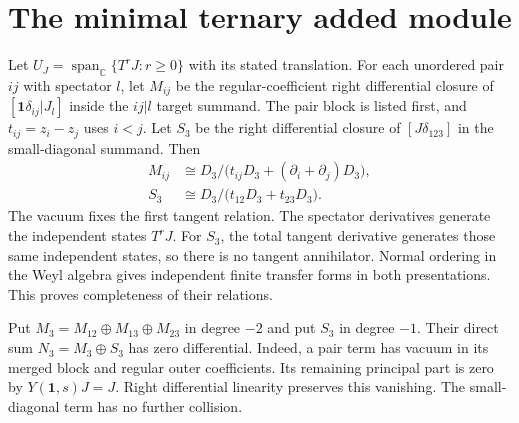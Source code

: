 \section{The minimal ternary added module}

Let $U_J=\operatorname{span}_{\mathbb C}\{T^rJ:r\geq0\}$ with its stated translation.
For each unordered pair $ij$ with spectator $l$, let $M_{ij}$ be the regular-coefficient right differential closure of
$[\mathbf1\delta_{ij}|J_l]$ inside the $ij|l$ target summand.
The pair block is listed first, and $t_{ij}=z_i-z_j$ uses $i<j$.
Let $S_3$ be the right differential closure of $[J\delta_{123}]$ in the small-diagonal summand.
Then
\begin{equation}\label{eq:bdtr-module-presentations}
 \begin{aligned}
 M_{ij}&\cong D_3/\bigl(t_{ij}D_3+(\partial_i+\partial_j)D_3\bigr),\\
 S_3&\cong D_3/\bigl(t_{12}D_3+t_{23}D_3\bigr).
 \end{aligned}
\end{equation}
The vacuum fixes the first tangent relation.
The spectator derivatives generate the independent states $T^rJ$.
For $S_3$, the total tangent derivative generates those same independent states, so there is no tangent annihilator.
Normal ordering in the Weyl algebra gives independent finite transfer forms in both presentations.
This proves completeness of their relations.

Put $M_3=M_{12}\oplus M_{13}\oplus M_{23}$ in degree $-2$ and put $S_3$ in degree $-1$.
Their direct sum $N_3=M_3\oplus S_3$ has zero differential.
Indeed, a pair term has vacuum in its merged block and regular outer coefficients.
Its remaining principal part is zero by $Y(\mathbf1,s)J=J$.
Right differential linearity preserves this vanishing.
The small-diagonal term has no further collision.

